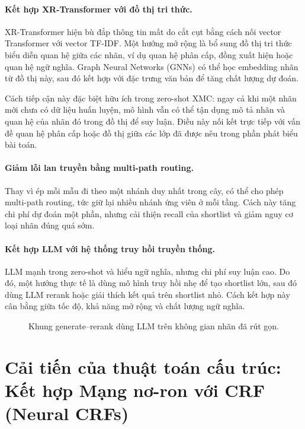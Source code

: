 \begin{expandbox}
\paragraph{Kết hợp XR-Transformer với đồ thị tri thức.}
XR-Transformer hiện bù đắp thông tin mất do cắt cụt bằng cách nối vector Transformer với vector TF-IDF. Một hướng mở rộng là bổ sung đồ thị tri thức biểu diễn quan hệ giữa các nhãn, ví dụ quan hệ phân cấp, đồng xuất hiện hoặc quan hệ ngữ nghĩa. Graph Neural Networks (GNNs) có thể học embedding nhãn từ đồ thị này, sau đó kết hợp với đặc trưng văn bản để tăng chất lượng dự đoán.

Cách tiếp cận này đặc biệt hữu ích trong zero-shot XMC: ngay cả khi một nhãn mới chưa có dữ liệu huấn luyện, mô hình vẫn có thể tận dụng mô tả nhãn và quan hệ của nhãn đó trong đồ thị để suy luận. Điều này nối kết trực tiếp với vấn đề quan hệ phân cấp hoặc đồ thị giữa các lớp đã được nêu trong phần phát biểu bài toán.

\paragraph{Giảm lỗi lan truyền bằng multi-path routing.}
Thay vì ép mỗi mẫu đi theo một nhánh duy nhất trong cây, có thể cho phép multi-path routing, tức giữ lại nhiều nhánh ứng viên ở mỗi tầng. Cách này tăng chi phí dự đoán một phần, nhưng cải thiện recall của shortlist và giảm nguy cơ loại nhãn đúng quá sớm.

\paragraph{Kết hợp LLM với hệ thống truy hồi truyền thống.}
LLM mạnh trong zero-shot và hiểu ngữ nghĩa, nhưng chi phí suy luận cao. Do đó, một hướng thực tế là dùng mô hình truy hồi nhẹ để tạo shortlist lớn, sau đó dùng LLM rerank hoặc giải thích kết quả trên shortlist nhỏ. Cách kết hợp này cân bằng giữa tốc độ, khả năng mở rộng và chất lượng ngữ nghĩa.
\begin{figure}[H]
\centering
\resizebox{0.98\textwidth}{!}{}
\caption{Khung generate--rerank dùng LLM trên không gian nhãn đã rút gọn.}
\label{fig:xmc-llm-rerank}
\end{figure}

\section{Cải tiến của thuật toán cấu trúc: Kết hợp Mạng nơ-ron với CRF (Neural CRFs)}
\label{sec:neural_crfs}


\end{expandbox}
